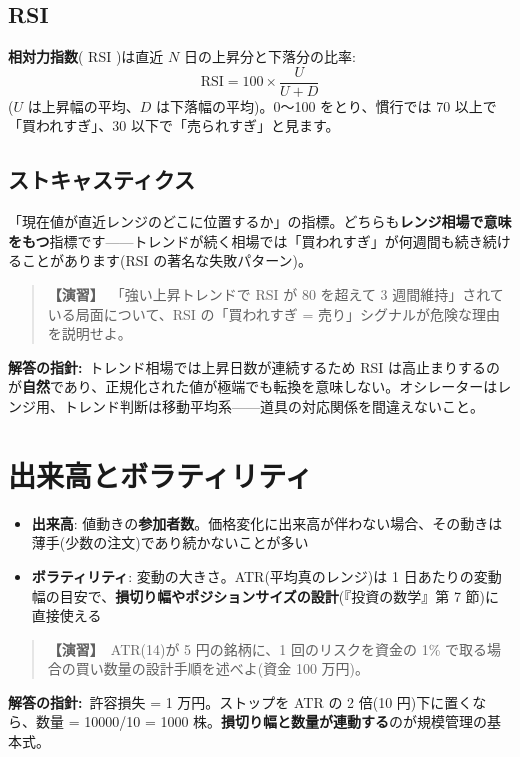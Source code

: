 \documentclass{article}
\begin{document}
\subsection{RSI}

\textbf{相対力指数}( RSI )は直近 \(N\) 日の上昇分と下落分の比率:
\[ \mathrm{RSI} = 100 \times \frac{U}{U + D} \]
(\(U\) は上昇幅の平均、\(D\) は下落幅の平均)。0〜100 をとり、慣行では 70 以上で「買われすぎ」、30 以下で「売られすぎ」と見ます。

\subsection{ストキャスティクス}

「現在値が直近レンジのどこに位置するか」の指標。どちらも\textbf{レンジ相場で意味をもつ}指標です——トレンドが続く相場では「買われすぎ」が何週間も続き続けることがあります(RSI の著名な失敗パターン)。

\begin{quote}
\textbf{【演習】}\ 「強い上昇トレンドで RSI が 80 を超えて 3 週間維持」されている局面について、RSI の「買われすぎ = 売り」シグナルが危険な理由を説明せよ。
\end{quote}

\textbf{解答の指針:}\ トレンド相場では上昇日数が連続するため RSI は高止まりするのが\textbf{自然}であり、正規化された値が極端でも転換を意味しない。オシレーターはレンジ用、トレンド判断は移動平均系——道具の対応関係を間違えないこと。

\section{出来高とボラティリティ}

\begin{itemize}
\item \textbf{出来高}: 値動きの\textbf{参加者数}。価格変化に出来高が伴わない場合、その動きは薄手(少数の注文)であり続かないことが多い
\item \textbf{ボラティリティ}: 変動の大きさ。ATR(平均真のレンジ)は 1 日あたりの変動幅の目安で、\textbf{損切り幅やポジションサイズの設計}(『投資の数学』第 7 節)に直接使える
\end{itemize}

\begin{quote}
\textbf{【演習】}\ ATR(14)が 5 円の銘柄に、1 回のリスクを資金の 1\% で取る場合の買い数量の設計手順を述べよ(資金 100 万円)。
\end{quote}

\textbf{解答の指針:}\ 許容損失 = 1 万円。ストップを ATR の 2 倍(10 円)下に置くなら、数量 = 10000/10 = 1000 株。\textbf{損切り幅と数量が連動する}のが規模管理の基本式。
\end{document}
